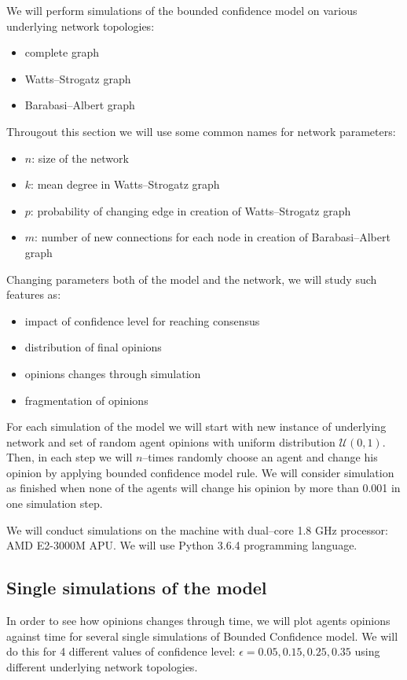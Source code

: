 \documentclass{article}
\begin{document}
We will perform simulations of the bounded confidence model on various underlying network topologies:
\begin{itemize}
\item complete graph
\item Watts--Strogatz graph
\item Barabasi--Albert graph
\end{itemize}
Througout this section we will use some common names for network parameters:
\begin{itemize}
\item $n$: size of the network
\item $k$: mean degree in Watts--Strogatz graph
\item $p$: probability of changing edge in creation of Watts--Strogatz graph
\item $m$: number of new connections for each node in creation of Barabasi--Albert graph
\end{itemize}
Changing parameters both of the model and the network, we will study such features as:
\begin{itemize}
\item impact of confidence level for reaching consensus
\item distribution of final opinions
\item opinions changes through simulation
\item fragmentation of opinions
\end{itemize}

For each simulation of the model we will start with new instance of underlying network and set of random agent opinions with uniform distribution $\mathcal{U}(0, 1)$. Then, in each step we will $n$--times randomly choose an agent and change his opinion by applying bounded confidence model rule. We will consider simulation as finished when none of the agents will change his opinion by more than 0.001 in one simulation step. 
\indent

We will conduct simulations on the machine with dual--core 1.8 GHz processor: AMD E2-3000M APU. We will use Python 3.6.4 programming language.

\subsection{Single simulations of the model}
In order to see how opinions changes through time, we will plot agents opinions against time for several single simulations of Bounded Confidence model. We will do this for 4 different values of confidence level: $\epsilon=0.05, 0.15, 0.25, 0.35$ using different underlying network topologies.
\end{document}

